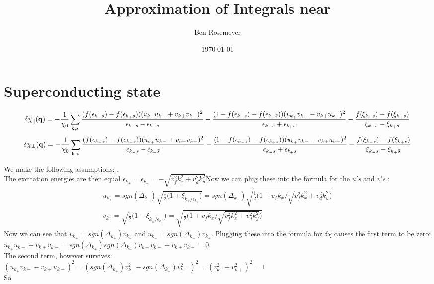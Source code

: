 \documentclass{article}
\begin{document}
\title{Approximation of Integrals near }
\author{Ben Rosemeyer}
\date{\today}
\maketitle


\section*{Superconducting state}
{\fontsize{8}{7}\selectfont
\begin{align}
\delta\chi_{\parallel}({\bf q})=-\frac{1}{\chi_0}\sum\limits_{{\bf k},s} \frac{(f(\epsilon_{k_-s})-f(\epsilon_{k_+s}))(u_{k_+}u_{k-}+v_{k+}v_{k-})^2}{\epsilon_{k_-s}-\epsilon_{k_+s}} 
-\frac{(1-f(\epsilon_{k_-s})-f(\epsilon_{k_+\bar{s}}))(u_{k_+}v_{k-}-v_{k+}u_{k-})^2}{\epsilon_{k_-s}+\epsilon_{k_+\bar{s}}}-\frac{f(\xi_{k_-s})-f(\xi_{k_+s})}{\xi_{k_-s}-\xi_{k_+s}}
\end{align}
\begin{align}
\delta\chi_{\perp}({\bf q})=-\frac{1}{\chi_0}\sum\limits_{{\bf k},s} \frac{(f(\epsilon_{k_-s})-f(\epsilon_{k_+\bar{s}}))(u_{k_+}u_{k-}+v_{k+}v_{k-})^2}{\epsilon_{k_-s}-\epsilon_{k_+\bar{s}}} 
-\frac{(1-f(\epsilon_{k_-s})-f(\epsilon_{k_+s}))(u_{k_+}v_{k-}-v_{k+}u_{k-})^2}{\epsilon_{k_-s}+\epsilon_{k_+s}}-\frac{f(\xi_{k_-s})-f(\xi_{k_+\bar{s}})}{\xi_{k_-s}-\xi_{k_+\bar{s}}}
\end{align}
}

We make the following assumptions: . \\
The excitation energies are then equal $\epsilon_{k_+}=\epsilon_{k_-}=-\sqrt{v_f^2k_x^2 +v_d^2 k_y^2}$Now we can plug these into the formula for the $u's$ and $v's$.:
\begin{align*}
u_{k_\pm}=sgn(\Delta_{k_\pm})\sqrt{\frac{1}{2}\big(1+ \xi_{k_\pm/\epsilon_{k_\pm}}\big)} =sgn(\Delta_{k_\pm})\sqrt{\frac{1}{2}\big(1\pm v_f k_x/\sqrt{v_f^2 k_x^2+v_d^2 k_y^2}\big)} \\
v_{k_\pm}=\sqrt{\frac{1}{2}\big(1- \xi_{k_\pm/\epsilon_{k_\pm}}\big)} =\sqrt{\frac{1}{2}\big(1\mp v_f k_x/\sqrt{v_f^2 k_x^2+v_d^2 k_y^2}\big)}
\end{align*}
Now we can see that $u_{k_+}=sgn(\Delta_{k_+})v_{k_-}$ and $u_{k_-}=sgn(\Delta_{k_-})v_{k_+}$. Plugging these into the formula for $\delta\chi$ causes the first term to be zero:{\large $u_{k_+}u_{k-}+v_{k+}v_{k-}=sgn(\Delta_{k_+})sgn(\Delta_{k_-})v_{k+}v_{k-}+v_{k+}v_{k-}=0$}. \\
The second term, however survives: \\
{\large $(u_{k_+}v_{k-}-v_{k+}u_{k-})^2=(sgn(\Delta_{k_+})v_{k_-}^2-sgn(\Delta_{k_-})v_{k+}^2)^2=(v_{k_-}^2+v_{k+}^2 )^2=1$} \\
So 
\end{document}
